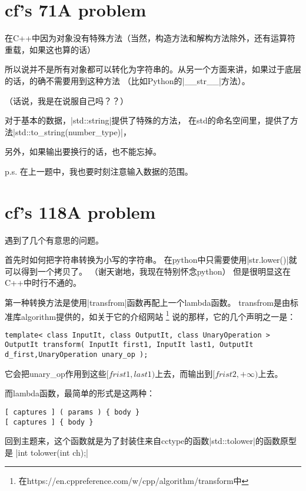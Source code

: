 
\section{cf's 71A problem}

在C++中因为对象没有特殊方法（当然，构造方法和解构方法除外，还有运算符重载，如果这也算的话）

所以说并不是所有对象都可以转化为字符串的。从另一个方面来讲，如果过于底层的话，的确不需要用到这种方法
（比如Python的\vb|\_\_str\_\_|方法）。

（话说，我是在说服自己吗？？）

对于基本的数据，\vb|std::string|提供了特殊的方法，
在std的命名空间里，提供了方法\vb|std::to\_string(number\_type)|，

另外，如果输出要换行的话，也不能忘掉。

p.s. 在上一题中，我也要时刻注意输入数据的范围。


\section{cf's 118A problem}

 遇到了几个有意思的问题。

 首先时如何把字符串转换为小写的字符串。
 在python中只需要使用\vb|str.lower()|就可以得到一个拷贝了。
 （谢天谢地，我现在特别怀念python）
 但是很明显这在C++中时行不通的。

 第一种转换方法是使用\vb|transfrom|函数再配上一个lambda函数。
 transfrom是由标准库algorithm提供的，如关于它的介绍网站%
 \footnote{在https://en.cppreference.com/w/cpp/algorithm/transform中}%
 说的那样，它的几个声明之一是：

 \begin{lstlisting}
template< class InputIt, class OutputIt, class UnaryOperation >
OutputIt transform( InputIt first1, InputIt last1, OutputIt d_first,UnaryOperation unary_op );
\end{lstlisting}

它会把unary\_op作用到这些$[frist1, last1)$上去，而输出到$[frist2, +\infty)$上去。

而lambda函数，最简单的形式是这两种：

\begin{lstlisting}
[ captures ] ( params ) { body }
[ captures ] { body }
\end{lstlisting}

回到主题来，这个函数就是为了封装住来自cctype的函数\vb|std::tolower|的函数原型是
\vb|int tolower(int ch);|

